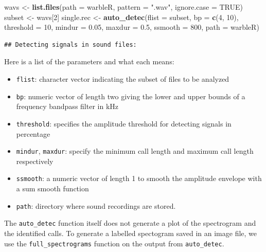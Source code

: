 \documentclass[
]{krantz}
\newenvironment{Shaded}{\begin{snugshade}}{\end{snugshade}}
\newcommand{\DataTypeTok}[1]{\textcolor[rgb]{0.13,0.29,0.53}{#1}}
\newcommand{\DecValTok}[1]{\textcolor[rgb]{0.00,0.00,0.81}{#1}}
\newcommand{\FloatTok}[1]{\textcolor[rgb]{0.00,0.00,0.81}{#1}}
\newcommand{\KeywordTok}[1]{\textcolor[rgb]{0.13,0.29,0.53}{\textbf{#1}}}
\newcommand{\NormalTok}[1]{#1}
\newcommand{\OtherTok}[1]{\textcolor[rgb]{0.56,0.35,0.01}{#1}}
\newcommand{\StringTok}[1]{\textcolor[rgb]{0.31,0.60,0.02}{#1}}
\providecommand{\tightlist}{%
  \setlength{\itemsep}{0pt}\setlength{\parskip}{0pt}}
\begin{document}
\begin{Shaded}
\begin{Highlighting}[]
\NormalTok{wavs \textless{}{-}}\StringTok{ }\KeywordTok{list.files}\NormalTok{(}\DataTypeTok{path =} \StringTok{\textquotesingle{}warbleR\textquotesingle{}}\NormalTok{, }\DataTypeTok{pattern =} \StringTok{".wav"}\NormalTok{, }
           \DataTypeTok{ignore.case =} \OtherTok{TRUE}\NormalTok{)}
\NormalTok{subset \textless{}{-}}\StringTok{ }\NormalTok{wavs[}\DecValTok{2}\NormalTok{]}
\NormalTok{single.rec \textless{}{-}}\StringTok{ }\KeywordTok{auto\_detec}\NormalTok{(}\DataTypeTok{flist =}\NormalTok{ subset, }\DataTypeTok{bp =} \KeywordTok{c}\NormalTok{(}\DecValTok{4}\NormalTok{, }\DecValTok{10}\NormalTok{), }\DataTypeTok{threshold =} \DecValTok{10}\NormalTok{, }
             \DataTypeTok{mindur =} \FloatTok{0.05}\NormalTok{, }\DataTypeTok{maxdur =} \FloatTok{0.5}\NormalTok{, }\DataTypeTok{ssmooth =} \DecValTok{800}\NormalTok{, }
             \DataTypeTok{path =} \StringTok{\textquotesingle{}warbleR\textquotesingle{}}\NormalTok{) }
\end{Highlighting}
\end{Shaded}

\begin{verbatim}
## Detecting signals in sound files:
\end{verbatim}

Here is a list of the parameters and what each means:

\begin{itemize}
\tightlist
\item
  \texttt{flist}: character vector indicating the subset of files to be analyzed
\item
  \texttt{bp}: numeric vector of length two giving the lower and upper bounds of a frequency bandpass filter in kHz
\item
  \texttt{threshold}: specifies the amplitude threshold for detecting signals in percentage
\item
  \texttt{mindur}, \texttt{maxdur}: specify the minimum call length and maximum call length respectively
\item
  \texttt{ssmooth}: a numeric vector of length 1 to smooth the amplitude envelope with a sum smooth function
\item
  \texttt{path}: directory where sound recordings are stored.
\end{itemize}

The \texttt{auto\_detec} function itself does not generate a plot of the spectrogram and the identified calls. To generate a labelled spectogram saved in an image file, we use the \texttt{full\_spectrograms} function on the output from \texttt{auto\_detec}.
\end{document}

